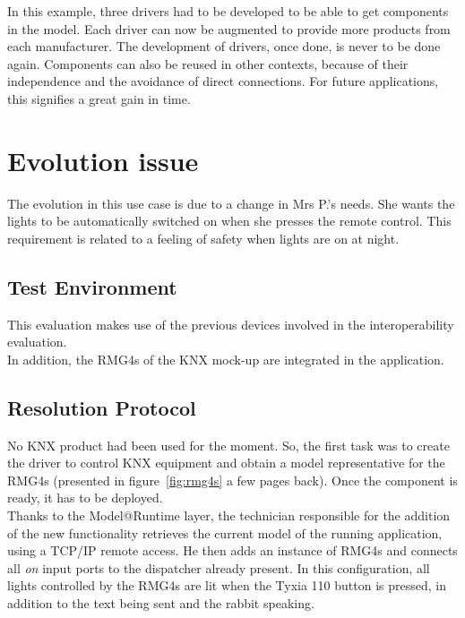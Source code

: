 In this example, three drivers had to be developed to be able to get components in the model. Each driver can now be augmented to provide more products from each manufacturer. The development of drivers, once done, is never to be done again. Components can also be reused in other contexts, because of their independence and the avoidance of direct connections. For future applications, this signifies a great gain in time.


\section{Evolution issue}
\label{subsec:evolution}

The evolution in this use case is due to a change in Mrs P.'s needs. She wants the lights to be automatically switched on when she presses the remote control. This requirement is related to a feeling of safety when lights are on at night.\\

\subsection{Test Environment}

This evaluation makes use of the previous devices involved in the interoperability evaluation.\\
In addition, the RMG4s of the KNX mock-up are integrated in the application.

\subsection{Resolution Protocol}


No KNX product had been used for the moment. So, the first task was to create the driver to control KNX equipment and obtain a model representative for the RMG4s (presented in figure~\ref{fig:rmg4s} a few pages back). Once the component is ready, it has to be deployed.\\
Thanks to the Model@Runtime layer, the technician responsible for the addition of the new functionality retrieves the current model of the running application, using a TCP/IP remote access. He then adds an instance of RMG4s and connects all {\it on} input ports to the dispatcher already present. In this configuration, all lights controlled by the RMG4s are lit when the Tyxia 110 button is pressed, in addition to the text being sent and the rabbit speaking.\\

